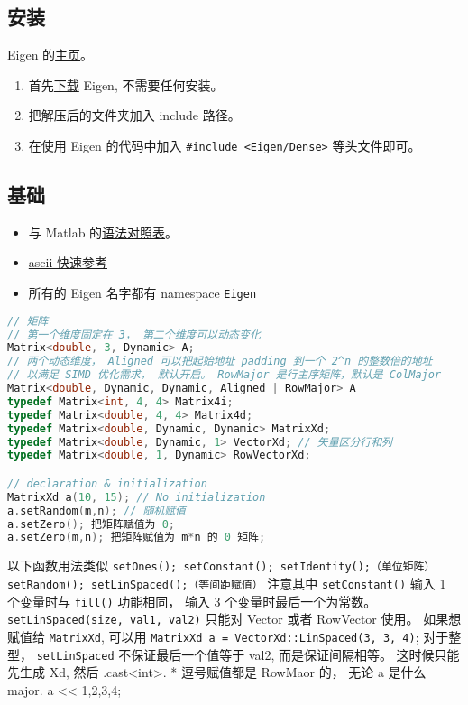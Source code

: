 
\subsection{安装}
Eigen 的\href{http://eigen.tuxfamily.org/index.php?title=Main_Page}{主页}。
\begin{enumerate}
\item 首先\href{http://eigen.tuxfamily.org/index.php?title=Main_Page#Documentation}{下载} Eigen, 不需要任何安装。
\item 把解压后的文件夹加入 include 路径。
\item 在使用 Eigen 的代码中加入 \verb|#include <Eigen/Dense>| 等头文件即可。
\end{enumerate}

\subsection{基础}
\begin{itemize}
\item 与 Matlab 的\href{https://eigen.tuxfamily.org/dox/AsciiQuickReference.txt}{语法对照表}。
\item \href{https://eigen.tuxfamily.org/dox/AsciiQuickReference.txt}{ascii 快速参考}
\item 所有的 Eigen 名字都有 namespace \verb|Eigen|
\end{itemize}

\begin{lstlisting}[language=cpp]
// 矩阵
// 第一个维度固定在 3， 第二个维度可以动态变化
Matrix<double, 3, Dynamic> A;
// 两个动态维度， Aligned 可以把起始地址 padding 到一个 2^n 的整数倍的地址
// 以满足 SIMD 优化需求， 默认开启。 RowMajor 是行主序矩阵，默认是 ColMajor
Matrix<double, Dynamic, Dynamic, Aligned | RowMajor> A 
typedef Matrix<int, 4, 4> Matrix4i;
typedef Matrix<double, 4, 4> Matrix4d;
typedef Matrix<double, Dynamic, Dynamic> MatrixXd;
typedef Matrix<double, Dynamic, 1> VectorXd; // 矢量区分行和列
typedef Matrix<double, 1, Dynamic> RowVectorXd;

// declaration & initialization
MatrixXd a(10, 15); // No initialization
a.setRandom(m,n); // 随机赋值
a.setZero(); 把矩阵赋值为 0;
a.setZero(m,n); 把矩阵赋值为 m*n 的 0 矩阵;
\end{lstlisting}

以下函数用法类似
\verb|setOnes(); setConstant(); setIdentity();（单位矩阵） setRandom(); setLinSpaced();（等间距赋值）|
注意其中 \verb|setConstant()| 输入 1 个变量时与 \verb|fill()| 功能相同， 输入 3 个变量时最后一个为常数。 \verb|setLinSpaced(size, val1, val2)| 只能对 Vector 或者 RowVector 使用。 如果想赋值给 \verb|MatrixXd|, 可以用 \verb|MatrixXd a = VectorXd::LinSpaced(3, 3, 4)|; 对于整型， \verb|setLinSpaced| 不保证最后一个值等于 val2, 而是保证间隔相等。 这时候只能先生成 Xd, 然后 .cast<int>.
* 逗号赋值都是 RowMaor 的， 无论 a 是什么 major.
a << 1,2,3,4;

